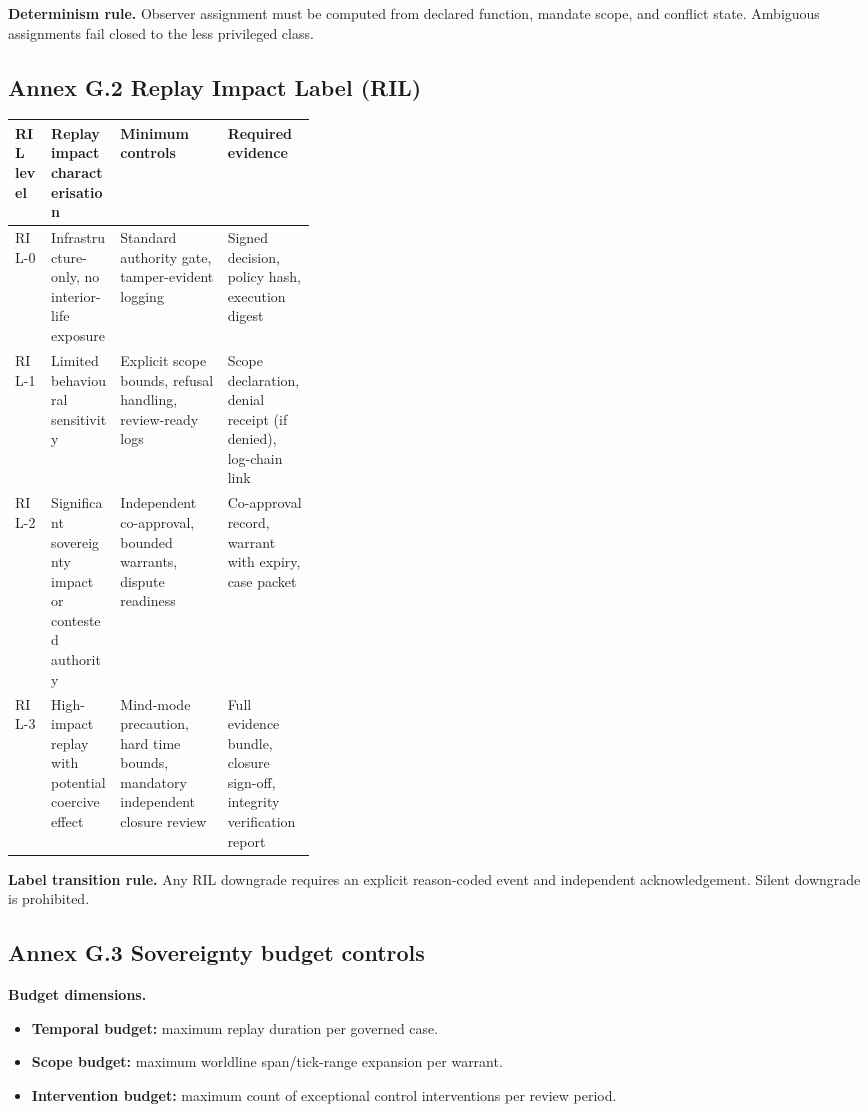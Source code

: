 \documentclass[11pt]{article}
\theoremstyle{definition}
\theoremstyle{plain}
\theoremstyle{remark}
\begin{document}
\textbf{Determinism rule.}
Observer assignment must be computed from declared function, mandate scope, and conflict state.
Ambiguous assignments fail closed to the less privileged class.

\subsection{Annex G.2 Replay Impact Label (RIL)}
\label{ann:ext-ril}

\begin{center}
\small
\setlength{\tabcolsep}{6pt}
\renewcommand{\arraystretch}{1.2}
\begin{tabularx}{0.98\linewidth}{p{0.12\linewidth} p{0.23\linewidth} Y Y}
\textbf{RIL level} & \textbf{Replay impact characterisation} & \textbf{Minimum controls} & \textbf{Required evidence} \\ \hline
{}
RIL-0 & Infrastructure-only, no interior-life exposure & Standard authority gate, tamper-evident logging & Signed decision, policy hash, execution digest \\
RIL-1 & Limited behavioural sensitivity & Explicit scope bounds, refusal handling, review-ready logs & Scope declaration, denial receipt (if denied), log-chain link \\
RIL-2 & Significant sovereignty impact or contested authority & Independent co-approval, bounded warrants, dispute readiness & Co-approval record, warrant with expiry, case packet \\
RIL-3 & High-impact replay with potential coercive effect & Mind-mode precaution, hard time bounds, mandatory independent closure review & Full evidence bundle, closure sign-off, integrity verification report \\
\end{tabularx}
\end{center}

\textbf{Label transition rule.}
Any RIL downgrade requires an explicit reason-coded event and independent acknowledgement.
Silent downgrade is prohibited.

\subsection{Annex G.3 Sovereignty budget controls}
\label{ann:ext-sov}

\textbf{Budget dimensions.}
\begin{itemize}[leftmargin=*]
  \item \textbf{Temporal budget:} maximum replay duration per governed case.
  \item \textbf{Scope budget:} maximum worldline span/tick-range expansion per warrant.
  \item \textbf{Intervention budget:} maximum count of exceptional control interventions per review period.
\end{itemize}
\end{document}
